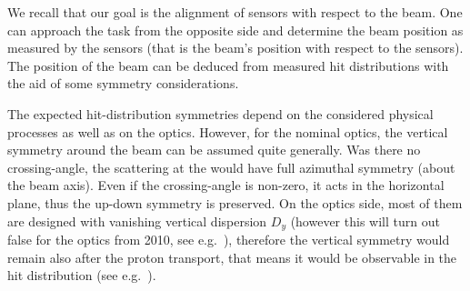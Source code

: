 We recall that our goal is the alignment of  sensors with respect to the beam. One can approach the task from the opposite side and determine the beam position as measured by the  sensors (that is the beam's position with respect to the  sensors). The position of the beam can be deduced from measured hit distributions with the aid of some symmetry considerations.


\iffalse
\> beam position is the theoretical hit position of an elastic proton with $\th = 0$ and the mean vertex position.
\> (in our OfflineSW convention, the beam is at zero)
\> misalignements $\De q$ and RP positions $q^{\rm RP}$ (in accordance with \Eq{misalignment definition})
$$q^{\rm RP}(\hbox{actual/misaligned}) = q^{\rm RP}(\hbox{thought/nominal}) + \De q$$
therefore for hit positions $q$
$$q(\hbox{reconstructed with thought geometry}) = q(\hbox{real}) - \De q$$
\fi

The expected hit-distribution symmetries depend on the considered physical processes as well as on the optics. However, for the nominal optics, the vertical symmetry around the beam can be assumed quite generally. Was there no crossing-angle, the scattering at the  would have full azimuthal symmetry (about the beam axis). Even if the crossing-angle is non-zero, it acts in the horizontal plane, thus the up-down symmetry is preserved. On the optics side, most of them are designed with vanishing vertical dispersion $D_y$ (however this will turn out false for the optics from 2010, see e.g.~), therefore the vertical symmetry would remain also after the proton transport, that means it would be observable in the hit distribution (see e.g.~).


